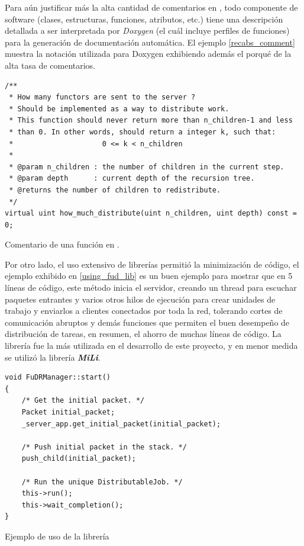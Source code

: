 Para aún justificar más la alta cantidad de comentarios en \rc, todo componente de software (clases, estructuras, funciones, atributos,
etc.) tiene una descripción detallada a ser interpretada por \textit{Doxygen} (el cuál incluye perfiles de funciones) para la generación de
documentación automática. El ejemplo \ref{recabs_comment} muestra la notación utilizada para Doxygen exhibiendo además el porqué de la alta
tasa de comentarios.

\begin{table}[!h]
    \lstset{language=C++}
    \begin{lstlisting}[frame=single]
/**
 * How many functors are sent to the server ?
 * Should be implemented as a way to distribute work.
 * This function should never return more than n_children-1 and less
 * than 0. In other words, should return a integer k, such that:
 *                     0 <= k < n_children
 *
 * @param n_children : the number of children in the current step.
 * @param depth      : current depth of the recursion tree.
 * @returns the number of children to redistribute.
 */
virtual uint how_much_distribute(uint n_children, uint depth) const = 0;
    \end{lstlisting}
    \centering \caption{Comentario de una función en \rc.}
    \label{recabs_comment}
\end{table}

Por otro lado, el uso extensivo de librerías permitió la minimización de código, el ejemplo exhibido en \ref{using_fud_lib} es un buen
ejemplo para mostrar que en 5 líneas de código, este método inicia el servidor, creando un thread para escuchar paquetes entrantes y varios
otros hilos de ejecución para crear unidades de trabajo y enviarlos a clientes conectados por toda la red, tolerando cortes de
comunicación abruptos y demás funciones que permiten el buen desempeño de distribución de tareas, en resumen, el ahorro de muchas líneas de
código. La librería \fud{} fue la más utilizada en el desarrollo de este proyecto, y en menor medida se utilizó la librería
\textit{\textbf{MiLi}}.

\begin{table}[!h]
    \lstset{language=C++}
    \begin{lstlisting}[frame=single]
void FuDRManager::start()
{
    /* Get the initial packet. */
    Packet initial_packet;
    _server_app.get_initial_packet(initial_packet);

    /* Push initial packet in the stack. */
    push_child(initial_packet);
  
    /* Run the unique DistributableJob. */
    this->run();
    this->wait_completion();    
}
    \end{lstlisting}
    \centering \caption{Ejemplo de uso de la librería \fud}
    \label{using_fud_lib}
\end{table}

